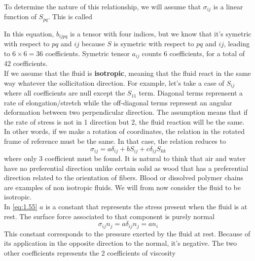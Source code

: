 	  To determine the nature of this relationship, we will assume that $\sigma _{ij} $ is a linear function of $S_{pq}$. This is called 
	\begin{center}	  
	  \end{center}
	  In this equation, $b_{ijpq}$ is a tensor with four indices, but we know that it's symetric with respect to $pq$ and $ij$ because $S$ is symetric with respect to $pq$ and $ij$, leading to $6 \times 6 = 36$ coefficients. Symetric tensor $a_{ij}$ counts 6 coefficients, for a total of 42 coefficients. \\
	  If we assume that the fluid is \textbf{isotropic}, meaning that the fluid react in the same way whatever the sollicitation direction. For example, let's take a case of $S_{ij}$ where all coefficients are null except the $S_{11}$ term. Diagonal terms reprensent a rate of elongation/stretch while the off-diagonal terms represent an angular deformation between two perpendicular direction. The assumption means that if the rate of stress is not in 1 direction but 2, the fluid reaction will be the same. In other words, if we make a rotation of coordinates, the relation in the rotated frame of reference must be the same. In that case, the relation reduces to
	  \begin{equation}
	  	\sigma _{ij} = a \delta _{ij} + bS _{ij} + c \delta _{ij}S_{kk}
	  	\label{eq:1.55}
	  \end{equation}
	  where only 3 coefficient must be found. It is natural to think that air and water have no preferential direction unlike certain solid as wood that has a preferential direction related to the orientation of fibers. Blood or dissolved polymer chains are examples of non isotropic fluids. We will from now consider the fluid to be isotropic. \\
In \eqref{eq:1.55} $a$ is a constant that represents the stress present when the fluid is at rest. 	The surface force associated to that component is purely normal 
		\begin{equation}
			\sigma _{ij} n_j = a \delta _{ij} n_j = an_i
		\end{equation}
		This constant corresponds to the pressure exerted by the fluid at rest. Because of its application in the opposite direction to the normal, it's negative. The two other coefficients represents the 2 coefficients of viscosity
